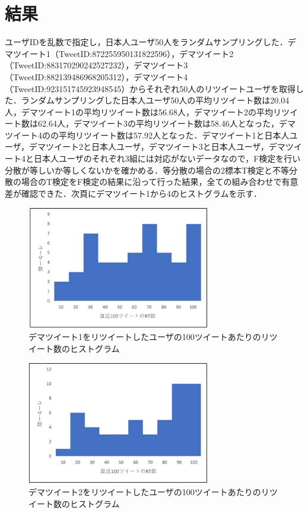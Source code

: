 \documentclass[uplatex,twocolumn]{jsarticle}
\begin{document}
\section{結果}
ユーザIDを乱数で指定し，日本人ユーザ50人をランダムサンプリングした．デマツイート1（TweetID:872255950131822596），デマツイート2（TweetID:883170290242527232），デマツイート3（TweetID:882139486968205312），デマツイート4（TweetID:923151745923948545）からそれぞれ50人のリツイートユーザを取得した．ランダムサンプリングした日本人ユーザ50人の平均リツイート数は20.04人，デマツイート1の平均リツイート数は56.68人，デマツイート2の平均リツイート数は62.64人，デマツイート3の平均リツイート数は58.46人となった，デマツイート4のの平均リツイート数は57.92人となった．デマツイート1と日本人ユーザ，デマツイート2と日本人ユーザ，デマツイート3と日本人ユーザ，デマツイート4と日本人ユーザのそれぞれ3組には対応がないデータなので，F検定を行い分散が等しいか等しくないかを確かめる．等分散の場合の2標本T検定と不等分散の場合のT検定をF検定の結果に沿って行った結果，全ての組み合わせで有意差が確認できた．次頁にデマツイート1から4のヒストグラムを示す．

\begin{figure}[htbp]
\centering
\includegraphics[clip,width=8.0cm]{d1.pdf}
\caption{デマツイート1をリツイートしたユーザの100ツイートあたりのリツイート数のヒストグラム}
\label{ヒストグラム1}
\end{figure}

\begin{figure}[htbp]
\centering
\includegraphics[clip,width=8.0cm]{d2.pdf}
\caption{デマツイート2をリツイートしたユーザの100ツイートあたりのリツイート数のヒストグラム}
\label{ヒストグラム2}
\end{figure}
\end{document}
